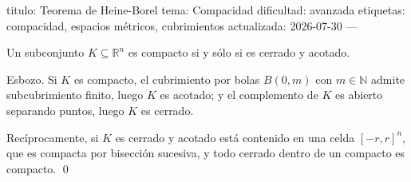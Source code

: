 titulo: Teorema de Heine-Borel
tema: Compacidad
dificultad: avanzada
etiquetas: compacidad, espacios métricos, cubrimientos
actualizada: 2026-07-30
---
\begin{teorema}
Un subconjunto $K \subseteq \mathbb{R}^n$ es compacto si y sólo si es cerrado y acotado.
\end{teorema}

\begin{demostracion}
Esbozo. Si $K$ es compacto, el cubrimiento por bolas $B(0,m)$ con $m \in \mathbb{N}$
admite subcubrimiento finito, luego $K$ es acotado; y el complemento de $K$ es
abierto separando puntos, luego $K$ es cerrado.

Recíprocamente, si $K$ es cerrado y acotado está contenido en una celda
$[-r,r]^n$, que es compacta por bisección sucesiva, y todo cerrado dentro de un
compacto es compacto. \qed
\end{demostracion}
